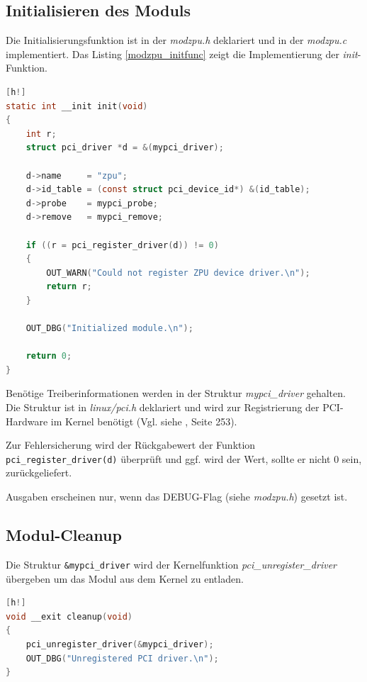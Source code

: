 \documentclass[11pt]{scrartcl}
\begin{document}

\subsection{Initialisieren des Moduls}

Die Initialisierungsfunktion ist in der \textit{modzpu.h} deklariert und in der \textit{modzpu.c} implementiert. Das Listing \ref{modzpu_initfunc} zeigt die Implementierung der \textit{init}-Funktion.

\begin{lstlisting}[language=C, firstnumber=67, label=modzpu_initfunc, caption=modzpu Init-Funktion][h!]
static int __init init(void)
{
	int r;
	struct pci_driver *d = &(mypci_driver);

	d->name     = "zpu";
	d->id_table = (const struct pci_device_id*) &(id_table);
	d->probe    = mypci_probe;
	d->remove   = mypci_remove;

	if ((r = pci_register_driver(d)) != 0)
	{
		OUT_WARN("Could not register ZPU device driver.\n");
		return r;
	}

	OUT_DBG("Initialized module.\n");

	return 0;
}
\end{lstlisting}

Benötige Treiberinformationen werden in der Struktur \textit{mypci\_driver} gehalten. Die Struktur ist in \textit{linux/pci.h} deklariert und wird zur Registrierung der PCI-Hardware im Kernel benötigt (Vgl. siehe \cite{script_hwstp}, Seite 253).
 
Zur Fehlersicherung wird der Rückgabewert der Funktion \texttt{pci\_register\_driver(d)} überprüft und ggf. wird der Wert, sollte er nicht 0 sein, zurückgeliefert. 

Ausgaben erscheinen nur, wenn das DEBUG-Flag (siehe \textit{modzpu.h}) gesetzt ist. 
\subsection{Modul-Cleanup}
Die Struktur \texttt{\&mypci\_driver} wird der Kernelfunktion \textit{pci\_unregister\_driver} übergeben um das Modul aus dem Kernel zu entladen. 

\begin{lstlisting}[language=C, firstnumber=67, label=modzpu_cleanupfunc, caption=modzpu Cleanup-Funktion][h!]
void __exit cleanup(void)
{
	pci_unregister_driver(&mypci_driver);
	OUT_DBG("Unregistered PCI driver.\n");
}
\end{lstlisting}
\end{document}
